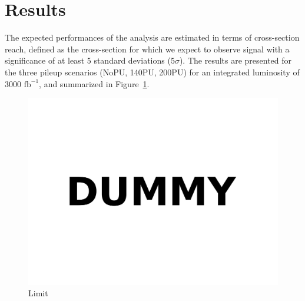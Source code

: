 \documentclass[11pt,oneside,a4paper]{article}
\begin{document}
\section{Results}

The expected performances of the analysis are estimated in terms of cross-section reach, defined as the cross-section for which we expect to observe signal with a significance of at least 5 standard deviations (5$\sigma$).
The results are presented for the three pileup scenarios (NoPU, 140PU, 200PU) for an integrated luminosity of 3000 $\mathrm{fb}^{-1}$, and summarized in Figure~\ref{fig:limit}.

\begin{figure}
\centering
\includegraphics[width=.5\textwidth]{figures/dummy.pdf}
\caption{Limit\label{fig:limit}}
\end{figure}
\end{document}
